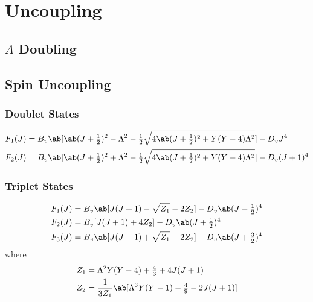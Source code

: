 \chapter{Uncoupling}
\label{c:uncoupling}

\section{\texorpdfstring{$\Lambda$}{Λ} Doubling}
\label{s:lambda_doubling}

\section{Spin Uncoupling}
\label{s:spin_uncoupling}

\subsection{Doublet States}

\begin{align*}
    F_1(J) & = B_v\ab[\ab(J + \tfrac{1}{2})^2 - \Lambda^2 - \tfrac{1}{2}\sqrt{4\ab(J + \tfrac{1}{2})^2 + Y(Y - 4)\Lambda^2}] - D_vJ^4       \\
    F_2(J) & = B_v\ab[\ab(J + \tfrac{1}{2})^2 + \Lambda^2 - \tfrac{1}{2}\sqrt{4\ab(J + \tfrac{1}{2})^2 + Y(Y - 4)\Lambda^2}] - D_v(J + 1)^4
\end{align*}

\subsection{Triplet States}

\begin{align*}
    F_1(J) & = B_v\ab[J(J + 1) - \sqrt{Z_1} - 2Z_2] - D_v\ab(J - \tfrac{1}{2})^4 \\
    F_2(J) & = B_v[J(J + 1) + 4Z_2] - D_v\ab(J + \tfrac{1}{2})^4                   \\
    F_3(J) & = B_v\ab[J(J + 1) + \sqrt{Z_1} - 2Z_2] - D_v\ab(J + \tfrac{3}{2})^4
\end{align*}
where
\begin{align*}
    Z_1 & = \Lambda^2Y(Y - 4) + \tfrac{4}{3} + 4J(J + 1)                      \\
    Z_2 & = \frac{1}{3Z_1}\ab[\Lambda^3Y(Y - 1) - \tfrac{4}{9} - 2J(J + 1)]
\end{align*}
